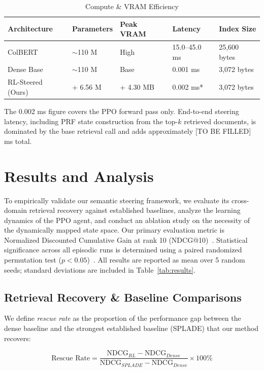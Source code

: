 \documentclass[sigconf]{acmart}
\begin{document}
\begin{table}[t]
  \caption{Compute \& VRAM Efficiency}
  \label{tab:compute}
  \begin{tabular}{lllll}
    \toprule
    Architecture & Parameters & Peak VRAM & Latency & Index Size\\
    \midrule
    ColBERT & $\sim$110 M & High & 15.0--45.0 ms & 25,600 bytes\\
    Dense Base & $\sim$110 M & Base & 0.001 ms & 3,072 bytes\\
    RL-Steered (Ours) & + 6.56 M & + 4.30 MB & 0.002 ms* & 3,072 bytes\\
    \bottomrule
  \end{tabular}
  \smallskip

  \small *The 0.002 ms figure covers the PPO forward pass only. End-to-end steering latency, including PRF state construction from the top-$k$ retrieved documents, is dominated by the base retrieval call and adds approximately [TO BE FILLED] ms total.
\end{table}

\section{Results and Analysis}

To empirically validate our semantic steering framework, we evaluate its cross-domain retrieval recovery against established baselines, analyze the learning dynamics of the PPO agent, and conduct an ablation study on the necessity of the dynamically mapped state space. Our primary evaluation metric is Normalized Discounted Cumulative Gain at rank 10 (NDCG@10)~\cite{jarvelin2002}. Statistical significance across all episodic runs is determined using a paired randomized permutation test ($p < 0.05$)~\cite{smucker2007}. All results are reported as mean over 5 random seeds; standard deviations are included in Table~\ref{tab:results}.

\subsection{Retrieval Recovery \& Baseline Comparisons}

We define \textit{rescue rate} as the proportion of the performance gap between the dense baseline and the strongest established baseline (SPLADE) that our method recovers:

\begin{equation}
\text{Rescue Rate} = \frac{\text{NDCG}_{RL} - \text{NDCG}_{Dense}}{\text{NDCG}_{SPLADE} - \text{NDCG}_{Dense}} \times 100\%
\end{equation}
\end{document}
